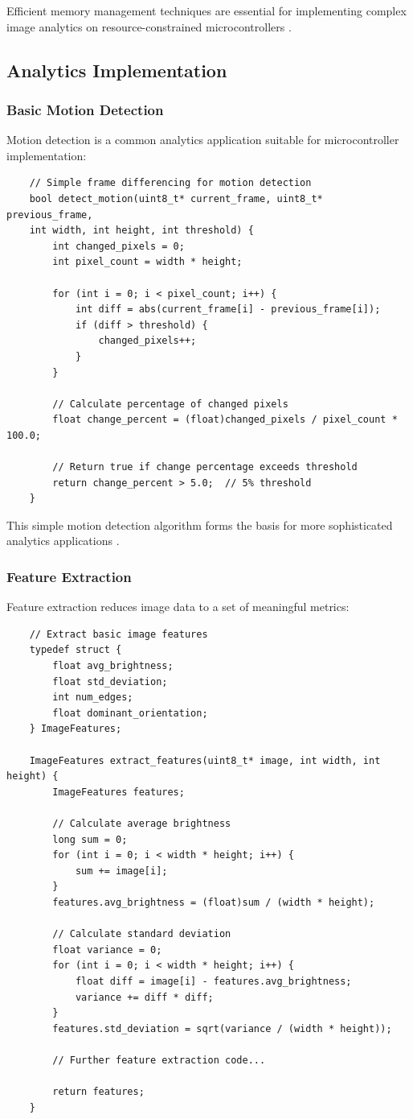 Efficient memory management techniques are essential for implementing complex image analytics on resource-constrained microcontrollers \cite{Arducam:2023}.

\subsection{Analytics Implementation}
\subsubsection{Basic Motion Detection}
Motion detection is a common analytics application suitable for microcontroller implementation:

\begin{verbatim}
	// Simple frame differencing for motion detection
	bool detect_motion(uint8_t* current_frame, uint8_t* previous_frame,
	int width, int height, int threshold) {
		int changed_pixels = 0;
		int pixel_count = width * height;
		
		for (int i = 0; i < pixel_count; i++) {
			int diff = abs(current_frame[i] - previous_frame[i]);
			if (diff > threshold) {
				changed_pixels++;
			}
		}
		
		// Calculate percentage of changed pixels
		float change_percent = (float)changed_pixels / pixel_count * 100.0;
		
		// Return true if change percentage exceeds threshold
		return change_percent > 5.0;  // 5% threshold
	}
\end{verbatim}

This simple motion detection algorithm forms the basis for more sophisticated analytics applications \cite{Arducam:2023}.

\subsubsection{Feature Extraction}
Feature extraction reduces image data to a set of meaningful metrics:

\begin{verbatim}
	// Extract basic image features
	typedef struct {
		float avg_brightness;
		float std_deviation;
		int num_edges;
		float dominant_orientation;
	} ImageFeatures;
	
	ImageFeatures extract_features(uint8_t* image, int width, int height) {
		ImageFeatures features;
		
		// Calculate average brightness
		long sum = 0;
		for (int i = 0; i < width * height; i++) {
			sum += image[i];
		}
		features.avg_brightness = (float)sum / (width * height);
		
		// Calculate standard deviation
		float variance = 0;
		for (int i = 0; i < width * height; i++) {
			float diff = image[i] - features.avg_brightness;
			variance += diff * diff;
		}
		features.std_deviation = sqrt(variance / (width * height));
		
		// Further feature extraction code...
		
		return features;
	}
\end{verbatim}

